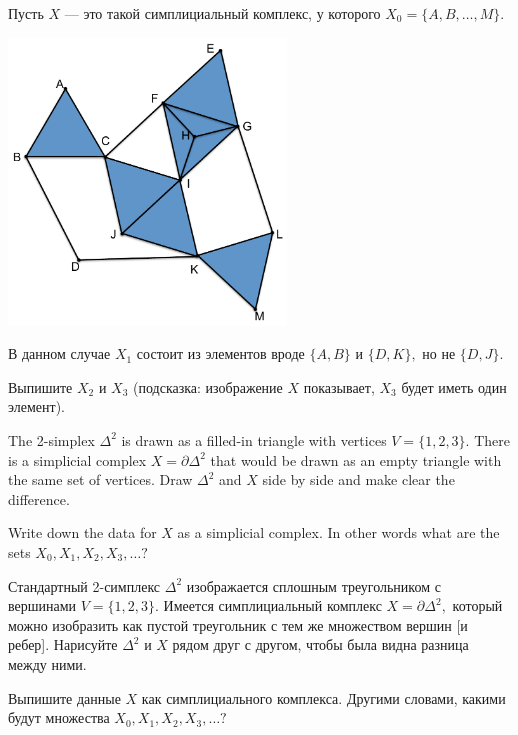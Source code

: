 \documentclass[CT4S-EN-RU]{subfiles}
\begin{document}
\begin{exerciseRUS}
Пусть $X$ — это такой симплициальный комплекс, у которого $X_0=\{A,B,\ldots,M\}.$ 
\begin{center}
\includegraphics[height=3in]{OlogNetwork5}
\end{center} 
В данном случае $X_1$ состоит из элементов вроде $\{A,B\}$ и $\{D,K\},$ но не $\{D,J\}.$ 

Выпишите $X_2$ и $X_3$ (подсказка: изображение $X$ показывает, $X_3$ будет иметь один элемент).
\end{exerciseRUS}

\begin{exerciseENG}
The 2-simplex $\Delta^2$ is drawn as a filled-in triangle with vertices $V=\{1,2,3\}.$ There is a simplicial complex $X=\partial\Delta^2$ that would be drawn as an empty triangle with the same set of vertices. 
\sexc Draw $\Delta^2$ and $X$ side by side and make clear the difference.
\item Write down the data for $X$ as a simplicial complex. In other words what are the sets $X_0, X_1, X_2, X_3,\ldots?$
\endsexc
\end{exerciseENG}

\begin{exerciseRUS}
Стандартный 2-симплекс $\Delta^2$ изображается сплошным треугольником с вершинами $V=\{1,2,3\}.$ Имеется симплициальный комплекс $X=\partial\Delta^2,$ который можно изобразить как пустой треугольник с тем же множеством вершин [и ребер]. 
\sexc Нарисуйте $\Delta^2$ и $X$ рядом друг с другом, чтобы была видна разница между ними.
\item Выпишите данные $X$ как симплициального комплекса. Другими словами, какими будут множества $X_0, X_1, X_2, X_3,\ldots?$
\endsexc
\end{exerciseRUS}
\end{document}
